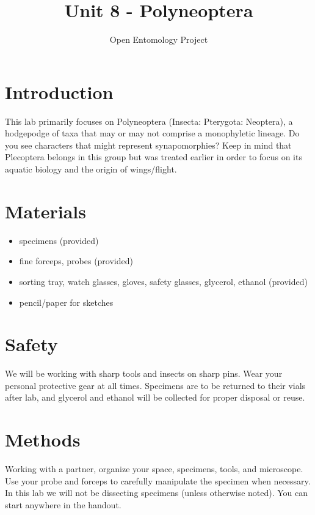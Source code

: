 \documentclass[letterpaper, 11pt]{article}
\title{Unit 8 - Polyneoptera}
\author{Open Entomology Project}
\begin{document}
\cleanlookdateon %
\maketitle
\thispagestyle{fancy}
\section*{Introduction}
This lab primarily focuses on Polyneoptera (Insecta: Pterygota: Neoptera), a hodgepodge of taxa that may or may not comprise a monophyletic lineage. Do you see characters that might represent synapomorphies? Keep in mind that Plecoptera belongs in this group but was treated earlier in order to focus on its aquatic biology and the origin of wings/flight.

\section*{Materials}
\begin{itemize}
\item specimens (provided)
\item fine forceps, probes (provided)
\item sorting tray, watch glasses, gloves, safety glasses, glycerol, ethanol (provided)
\item pencil/paper for sketches
\end{itemize}

\section*{Safety}
We will be working with sharp tools and insects on sharp pins. Wear your personal protective gear at all times. Specimens are to be returned to their vials after lab, and glycerol and ethanol will be collected for proper disposal or reuse.

\section*{Methods}
Working with a partner, organize your space, specimens, tools, and microscope. Use your probe and forceps to carefully manipulate the specimen when necessary. In this lab we will not be dissecting specimens (unless otherwise noted). You can start anywhere in the handout.
\end{document}
